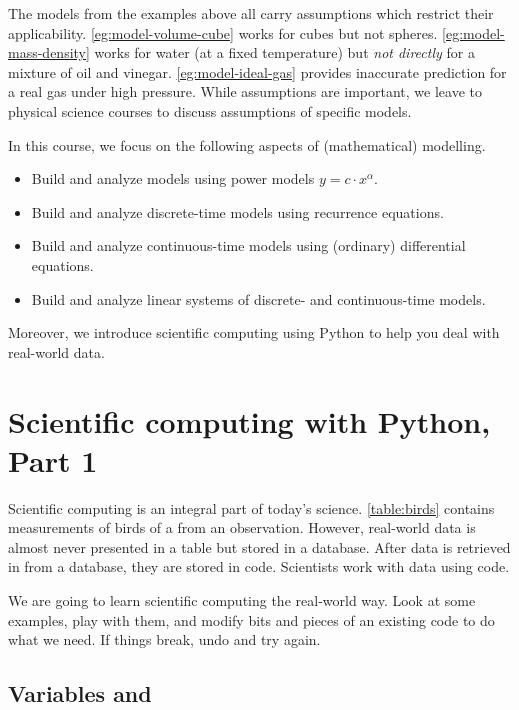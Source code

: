 \documentclass[../book.tex]{subfiles}
\begin{document}
The models from the examples above all carry assumptions which restrict their applicability. \cref{eg:model-volume-cube} works for cubes but not spheres. \cref{eg:model-mass-density} works for water (at a fixed temperature) but \emph{not directly} for a mixture of oil and vinegar. \cref{eg:model-ideal-gas} provides inaccurate prediction for a real gas under high pressure. While assumptions are important, we leave to physical science courses to discuss assumptions of specific models.

\begin{attentionbox}\label{attn:modelling-overview}
In this course, we focus on the following aspects of (mathematical) modelling.

\begin{itemize}
  \item Build and analyze models using power models \(y = c \cdot x^{\alpha}\).
  \item Build and analyze discrete-time models using recurrence equations.
  \item Build and analyze continuous-time models using (ordinary) differential equations.
  \item Build and analyze linear systems of discrete- and continuous-time models.
\end{itemize}

Moreover, we introduce scientific computing using Python to help you deal with real-world data.
\end{attentionbox}

\section{Scientific computing with Python, Part 1}

Scientific computing is an integral part of today's science.  \cref{table:birds} contains measurements of birds of a from an observation.  However, real-world data is almost never presented in a table but stored in a database.  After data is retrieved in from a database, they are stored in code.  Scientists work with data using code.

We are going to learn scientific computing the real-world way.  Look at some examples, play with them, and modify bits and pieces of an existing code to do what we need. If things break, undo and try again.

\subsection{Variables and }
\end{document}
